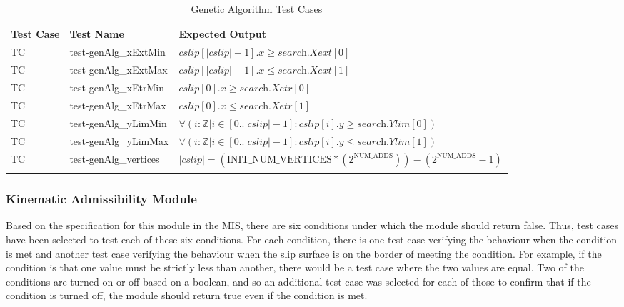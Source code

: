 \documentclass[12pt, titlepage]{article}
\newcounter{utestnum} %
\begin{document}
\begin{longtable}{  l  p{4cm}  p{6cm}  }
	\hline
	\textbf{Test Case} & \textbf{Test Name} & \textbf{Expected Output} \\
	\hline
	TC{utestnum}\theutestnum  \label{TC_GenAlgXextMin} & 
	test-genAlg\_xExtMin &  $\textit{cslip}[|\textit{cslip}|-1].x \geq 
	\textit{search.Xext}[0]$\\
	\hline 
	TC{utestnum}\theutestnum  \label{TC_GenAlgXextMax} & 
	test-genAlg\_xExtMax &  $\textit{cslip}[|\textit{cslip}|-1].x \leq 
	\textit{search.Xext}[1]$\\
	\hline 
	TC{utestnum}\theutestnum  \label{TC_GenAlgXetrMin} & 
	test-genAlg\_xEtrMin &  $\textit{cslip}[0].x \geq \textit{search.Xetr}[0]$\\
	\hline 
	TC{utestnum}\theutestnum  \label{TC_GenAlgXetrMax} & 
	test-genAlg\_xEtrMax &  $\textit{cslip}[0].x \leq \textit{search.Xetr}[1]$\\
	\hline 
	TC{utestnum}\theutestnum  \label{TC_GenAlgYlimMin} & 
	test-genAlg\_yLimMin &  $\forall(i : \mathbb{Z} | i \in 
	[0..|\textit{cslip}|-1] : \textit{cslip}[i].y \geq 
	\textit{search.Ylim}[0])$ \\
	\hline 
	TC{utestnum}\theutestnum  \label{TC_GenAlgYlimMax} & 
	test-genAlg\_yLimMax &  $\forall(i : \mathbb{Z} | i \in 
	[0..|\textit{cslip}|-1] : \textit{cslip}[i].y \leq 
	\textit{search.Ylim}[1])$ \\
	\hline
	TC{utestnum}\theutestnum  \label{TC_GenAlgVertices} & 
	test-genAlg\_vertices &  $|\textit{cslip}| = 
	(\text{INIT\_NUM\_VERTICES}*(2^\text{NUM\_ADDS}))-(2^\text{NUM\_ADDS}-1)$ 
	\\
	\hline
	\caption{Genetic Algorithm Test Cases}
	\label{GenAlgTests}
\end{longtable}

\subsubsection{Kinematic Admissibility Module}

Based on the specification for this module in the MIS, there are six conditions 
under which the module should return false. Thus, test cases have been selected 
to test each of these six conditions. For each condition, there is one test 
case verifying the behaviour when the condition is met and another test case 
verifying the behaviour when the slip surface is on the border of meeting the 
condition. For example, if the condition is that one value must be strictly 
less than another, there would be a test case where the two values are equal. 
Two of the conditions are turned on or off based on a boolean, and so an 
additional test case was selected for each of those to confirm that if the 
condition is turned off, the module should return true even if the condition is 
met. 
\end{document}
